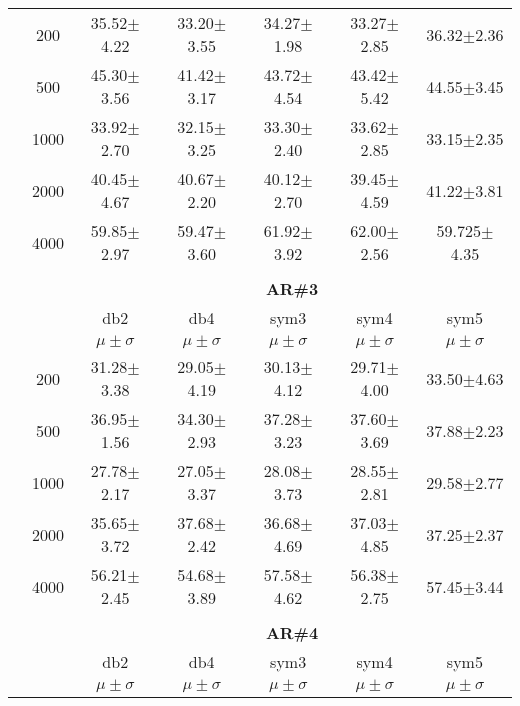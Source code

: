 \begin{table}[H]
\begin{tabular}{|c|c|c c c c c|}
\multicolumn{1}{|c|}{ \multirow{5}{*}{\rotatebox[origin=c]{90}{\textbf{Neurônios}}} }
&200	&35.52$\pm$4.22	&33.20$\pm$3.55	&34.27$\pm$1.98	&33.27$\pm$2.85	&36.32$\pm$2.36	\\\cline{2-7}
&500	&45.30$\pm$3.56	&41.42$\pm$3.17	&43.72$\pm$4.54	&43.42$\pm$5.42	&44.55$\pm$3.45	\\\cline{2-7}
&1000	&33.92$\pm$2.70	&32.15$\pm$3.25	&33.30$\pm$2.40	&33.62$\pm$2.85	&33.15$\pm$2.35	\\\cline{2-7}
&2000	&40.45$\pm$4.67	&40.67$\pm$2.20	&40.12$\pm$2.70	&39.45$\pm$4.59	&41.22$\pm$3.81	\\\cline{2-7}
&4000	&59.85$\pm$2.97	&59.47$\pm$3.60 &61.92$\pm$3.92	&62.00$\pm$2.56	&59.725$\pm$4.35	\\ \midrule
\multicolumn{7}{c}{}\\ 



\cline{3-7}
\multicolumn{2}{c|}{\multirow{3}{*}{}} & \multicolumn{5}{c|}{\textbf{AR\#3}}   \\\cline{3-7} 

\multicolumn{2}{c|}{}  & db2 & db4 & sym3 & sym4 & sym5 \\\cline{3-7}
\multicolumn{2}{c|}{}& $\mu \pm \sigma$ & $\mu \pm \sigma$ & $\mu \pm \sigma$ & $\mu \pm \sigma$ & $\mu \pm \sigma$ \\\hline

\multicolumn{1}{|c|}{ \multirow{5}{*}{\rotatebox[origin=c]{90}{\textbf{Neurônios}}} }
&200	&31.28$\pm$3.38	&29.05$\pm$4.19	&30.13$\pm$4.12	&29.71$\pm$4.00	&33.50$\pm$4.63	\\\cline{2-7}
&500	&36.95$\pm$1.56	&34.30$\pm$2.93	&37.28$\pm$3.23	&37.60$\pm$3.69	&37.88$\pm$2.23	\\\cline{2-7}
&1000	&27.78$\pm$2.17	&27.05$\pm$3.37	&28.08$\pm$3.73	&28.55$\pm$2.81	&29.58$\pm$2.77	\\\cline{2-7}
&2000	&35.65$\pm$3.72	&37.68$\pm$2.42	&36.68$\pm$4.69	&37.03$\pm$4.85	&37.25$\pm$2.37	\\\cline{2-7}
&4000	&56.21$\pm$2.45	&54.68$\pm$3.89 &57.58$\pm$4.62	&56.38$\pm$2.75	&57.45$\pm$3.44	

	\\\midrule 
\multicolumn{7}{c}{}\\ 



\cline{3-7}
\multicolumn{2}{c|}{\multirow{3}{*}{}} & \multicolumn{5}{c|}{\textbf{AR\#4}}   \\\cline{3-7} 

\multicolumn{2}{c|}{}  & db2 & db4 & sym3 & sym4 & sym5 \\\cline{3-7}
\multicolumn{2}{c|}{}& $\mu \pm \sigma$ & $\mu \pm \sigma$ & $\mu \pm \sigma$ & $\mu \pm \sigma$ & $\mu \pm \sigma$ \\\hline


\end{tabular}
\end{table}

